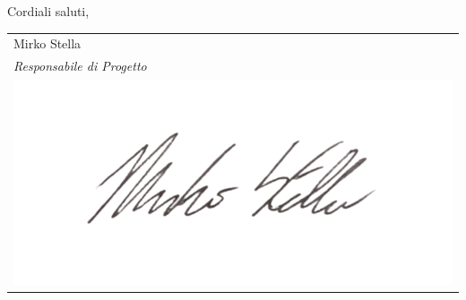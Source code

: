 \documentclass[10pt]{article}
\begin{document}
Cordiali saluti,

\vspace{15pt}

\hfill
\begin{tabular}{ l @{} }
Mirko Stella\\
\textit{Responsabile di Progetto}\\
\includegraphics[scale=0.2]{images/firma_responsabile.png}
\end{tabular}
\end{document}

